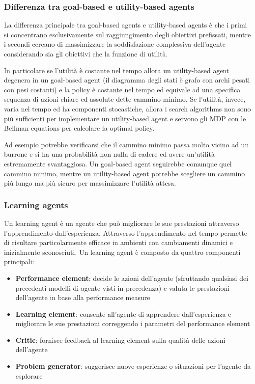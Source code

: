 \subsubsection*{Differenza tra goal-based e utility-based agents}
La differenza principale tra goal-based agents e utility-based agents è che i primi si concentrano esclusivamente sul
raggiungimento degli obiettivi prefissati, mentre i secondi cercano di massimizzare la soddisfazione complessiva dell'agente
considerando sia gli obiettivi che la funzione di utilità.

In particolare se l'utilità è costante nel tempo allora un utility-based agent degenera in un goal-based agent (il diagramma
degli stati è grafo con archi pesati con pesi costanti) e la policy è costante nel tempo ed equivale ad una specifica sequenza
di azioni chiare ed assolute dette cammino minimo. Se l'utilità, invece, varia nel tempo ed ha componenti stocastiche, allora
i search algorithms non sono più sufficienti per implementare un utility-based agent e servono gli MDP con le Bellman equations
per calcolare la optimal policy.

Ad esempio potrebbe verificarsi che il cammino minimo passa molto vicino ad un burrone e si ha una probabilità non nulla di
cadere ed avere un'utilità estremamente svantaggiosa. Un goal-based agent seguirebbe comunque quel cammino minimo, mentre un
utility-based agent potrebbe scegliere un cammino più lungo ma più sicuro per massimizzare l'utilità attesa.

\subsubsection*{Learning agents}
Un learning agent è un agente che può migliorare le sue prestazioni attraverso l'apprendimento dall'esperienza. Attraverso
l'apprendimento nel tempo permette di risultare particolarmente efficace in ambienti con cambiamenti dinamici e inizialmente
sconosciuti. Un learning agent è composto da quattro componenti principali:
\begin{itemize}
	\item \textbf{Performance element}: decide le azioni dell'agente (sfruttando qualsiasi dei precedenti modelli di agente
	visti in precedenza) e valuta le prestazioni dell'agente in base alla performance measure
	\item \textbf{Learning element}: consente all'agente di apprendere dall'esperienza e migliorare le sue prestazioni
	correggendo i parametri del performance element
	\item \textbf{Critic}: fornisce feedback al learning element sulla qualità delle azioni dell'agente
	\item \textbf{Problem generator}: suggerisce nuove esperienze o situazioni per l'agente da esplorare
\end{itemize}
